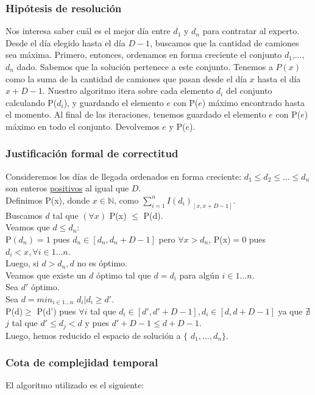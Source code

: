 \documentclass[11pt, a4paper, twoside]{article}
\begin{document}
\subsubsection{Hipótesis de resolución}

Nos interesa saber cuál es el mejor día entre $d_1$ y $d_n$ para contratar al
experto. Desde el día elegido hasta el día $D - 1$, buscamos que la cantidad de
camiones sea máxima. Primero, entonces, ordenamos en forma creciente el conjunto
{$d_1$,...,$d_n$} dado. Sabemos que la solución pertenece a este conjunto.
Tenemos a $P(x)$ como la suma de la cantidad de camiones que pasan desde el día
$x$ hasta el día $x+D-1$. Nuestro algoritmo itera sobre cada elemento $d_i$ del
conjunto calculando P($d_i$), y guardando el elemento $e$ con P($e$) máximo
encontrado hasta el momento. Al final de las iteraciones, tenemos guardado el
elemento $e$ con P($e$) máximo en todo el conjunto. Devolvemos $e$ y P($e$).


\subsubsection{Justificación formal de correctitud}

Consideremos los días de llegada ordenados en forma creciente: $d_1 \le d_2 \le
\dots \le d_n$ son enteros \underline{positivos} al igual que $D$. \\ Definimos
P(x), donde $x \in \mathbb{N}$, como $\sum_{i=1}^{n} I(d_i)_{[x,x+D-1]}$. \\
Buscamos $d$ tal que $(\forall x)$ P(x) $\le$ P(d). \\ Veamos que $d \le d_n$:
\\ P$(d_n)=1$ pues $d_n \in [d_n,d_n + D - 1]$ pero $\forall x > d_n$, P(x)$=0$
pues $d_i < x, \forall i \in 1...n$.\\ Luego, si $d > d_n, d$ no es óptimo. \\
Veamos que existe un $d$ óptimo tal que $d=d_i$ para algún $i \in 1...n$. \\ Sea
$d'$ óptimo. \\ Sea $d=min_{i \in 1...n}$ $d_i \big| d_i \ge d'$. \\ P(d)$\ge$
P(d') pues $\forall i$ tal que $d_i \in [d',d'+D-1], d_i \in [d,d+D-1]$ ya que
$\nexists$ $j$ tal que $d' \le d_j < d$ y pues $d'+D-1 \le d+D-1$. \\ Luego,
hemos reducido el espacio de solución a $\{$ $d_1,...,d_n$$\}$.


\subsubsection{Cota de complejidad temporal}\label{sec:ej1cotatemporal}
El algoritmo utilizado es el siguiente:
\end{document}
